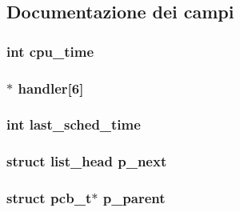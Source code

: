 \subsection{Documentazione dei campi}
\hypertarget{structpcb__t_a7438f6e4370c77335272481935c3c2da}{
\subsubsection[{cpu\-\_\-time}]{\setlength{\rightskip}{0pt plus 5cm}int cpu\-\_\-time}}\label{structpcb__t_a7438f6e4370c77335272481935c3c2da}
\hypertarget{structpcb__t_aafb68b6d949df584f04372a411587a3e}{
\subsubsection[{handler}]{$\ast$ handler\mbox{[}6\mbox{]}}}\label{structpcb__t_aafb68b6d949df584f04372a411587a3e}
\hypertarget{structpcb__t_aab19ac996ae189b600c68cb4e4e8b66b}{
\subsubsection[{last\-\_\-sched\-\_\-time}]{\setlength{\rightskip}{0pt plus 5cm}int last\-\_\-sched\-\_\-time}}\label{structpcb__t_aab19ac996ae189b600c68cb4e4e8b66b}
\hypertarget{structpcb__t_adb25d84c36e53123e815e122610fd3ab}{
\subsubsection[{p\-\_\-next}]{\setlength{\rightskip}{0pt plus 5cm}struct {\bf list\-\_\-head} p\-\_\-next}}\label{structpcb__t_adb25d84c36e53123e815e122610fd3ab}
\hypertarget{structpcb__t_a4d7a714ff6400c5cc2977964fc3b0c53}{
\subsubsection[{p\-\_\-parent}]{\setlength{\rightskip}{0pt plus 5cm}struct {\bf pcb\-\_\-t}$\ast$ p\-\_\-parent}}\label{structpcb__t_a4d7a714ff6400c5cc2977964fc3b0c53}
